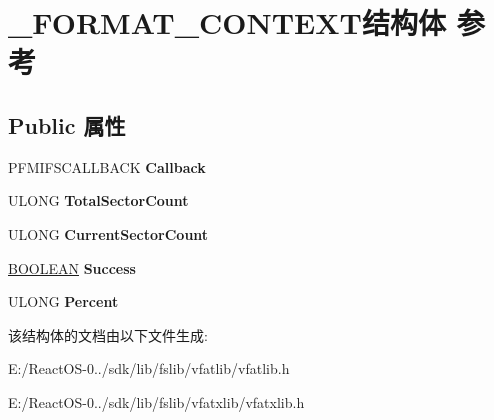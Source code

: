 \hypertarget{struct___f_o_r_m_a_t___c_o_n_t_e_x_t}{}\section{\+\_\+\+F\+O\+R\+M\+A\+T\+\_\+\+C\+O\+N\+T\+E\+X\+T结构体 参考}
\label{struct___f_o_r_m_a_t___c_o_n_t_e_x_t}
\subsection*{Public 属性}
\begin{DoxyCompactItemize}
\item 
\mbox{\label{struct___f_o_r_m_a_t___c_o_n_t_e_x_t_afeb7d26996a9ec0dc1468af6ed9a9d5d}} 
P\+F\+M\+I\+F\+S\+C\+A\+L\+L\+B\+A\+CK {\bfseries Callback}
\item 
\mbox{\label{struct___f_o_r_m_a_t___c_o_n_t_e_x_t_ac230e10067c5874ac09ef4e8909af09f}} 
U\+L\+O\+NG {\bfseries Total\+Sector\+Count}
\item 
\mbox{\label{struct___f_o_r_m_a_t___c_o_n_t_e_x_t_a8b61ff2c64af1b4f4afb7d1b1b84bb71}} 
U\+L\+O\+NG {\bfseries Current\+Sector\+Count}
\item 
\mbox{\label{struct___f_o_r_m_a_t___c_o_n_t_e_x_t_aa58621d6f1188900ce9ecd8bb010ae17}} 
\hyperlink{_processor_bind_8h_a112e3146cb38b6ee95e64d85842e380a}{B\+O\+O\+L\+E\+AN} {\bfseries Success}
\item 
\mbox{\label{struct___f_o_r_m_a_t___c_o_n_t_e_x_t_a19461f5ef3c568185c2aeb8be83f98ee}} 
U\+L\+O\+NG {\bfseries Percent}
\end{DoxyCompactItemize}


该结构体的文档由以下文件生成\+:\begin{DoxyCompactItemize}
\item 
E\+:/\+React\+O\+S-\/0../sdk/lib/fslib/vfatlib/vfatlib.\+h\item 
E\+:/\+React\+O\+S-\/0../sdk/lib/fslib/vfatxlib/vfatxlib.\+h\end{DoxyCompactItemize}
